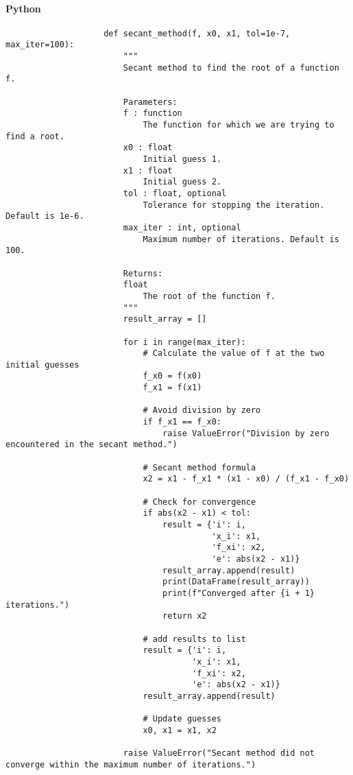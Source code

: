 \documentclass{article}
\begin{document}
            \paragraph{Python}
                \begin{verbatim}
                    def secant_method(f, x0, x1, tol=1e-7, max_iter=100):
                        """
                        Secant method to find the root of a function f.

                        Parameters:
                        f : function
                            The function for which we are trying to find a root.
                        x0 : float
                            Initial guess 1.
                        x1 : float
                            Initial guess 2.
                        tol : float, optional
                            Tolerance for stopping the iteration. Default is 1e-6.
                        max_iter : int, optional
                            Maximum number of iterations. Default is 100.

                        Returns:
                        float
                            The root of the function f.
                        """
                        result_array = []

                        for i in range(max_iter):
                            # Calculate the value of f at the two initial guesses
                            f_x0 = f(x0)
                            f_x1 = f(x1)

                            # Avoid division by zero
                            if f_x1 == f_x0:
                                raise ValueError("Division by zero encountered in the secant method.")

                            # Secant method formula
                            x2 = x1 - f_x1 * (x1 - x0) / (f_x1 - f_x0)

                            # Check for convergence
                            if abs(x2 - x1) < tol:
                                result = {'i': i,
                                          'x_i': x1,
                                          'f_xi': x2,
                                          'e': abs(x2 - x1)}
                                result_array.append(result)
                                print(DataFrame(result_array))
                                print(f"Converged after {i + 1} iterations.")
                                return x2

                            # add results to list
                            result = {'i': i,
                                      'x_i': x1,
                                      'f_xi': x2,
                                      'e': abs(x2 - x1)}
                            result_array.append(result)

                            # Update guesses
                            x0, x1 = x1, x2

                        raise ValueError("Secant method did not converge within the maximum number of iterations.")
                \end{verbatim}
\end{document}
